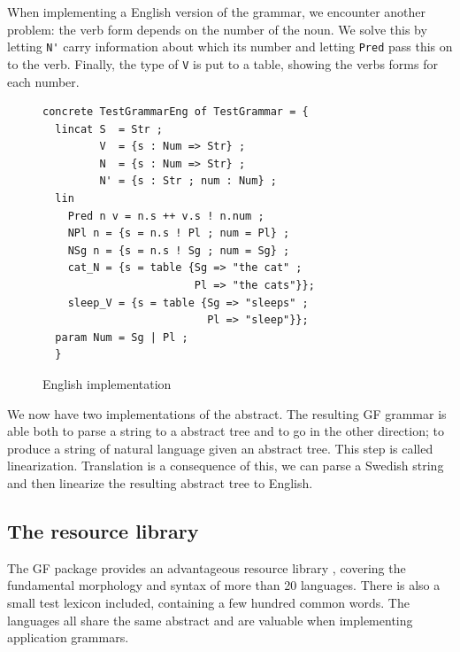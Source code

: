\documentclass{report}
\begin{document}
When implementing a English version of the grammar, we encounter another
problem: the verb form depends on the number of the noun. We solve this by letting
\verb|N'| carry
information about which its number and letting \verb|Pred| pass this on to the
verb. Finally, the type of \verb|V| is put to a table, showing the verbs forms for each
number.
\begin{figure}[h!]
\begin{verbatim}              
concrete TestGrammarEng of TestGrammar = {
  lincat S  = Str ;
         V  = {s : Num => Str} ;
         N  = {s : Num => Str} ;
         N' = {s : Str ; num : Num} ;
  lin   
    Pred n v = n.s ++ v.s ! n.num ;
    NPl n = {s = n.s ! Pl ; num = Pl} ;
    NSg n = {s = n.s ! Sg ; num = Sg} ;
    cat_N = {s = table {Sg => "the cat" ;
                        Pl => "the cats"}};
    sleep_V = {s = table {Sg => "sleeps" ; 
                          Pl => "sleep"}};
  param Num = Sg | Pl ;
  }
\end{verbatim}           
\caption{English implementation}
\label{fig:gfTestEng}
\end{figure}


We now have two implementations of the abstract. The resulting GF grammar is able both to
parse a string to a abstract tree and to go in the other direction; to produce
a string of natural language given an abstract tree. This step is called linearization.
Translation is a consequence of this, we can parse a Swedish string and then 
linearize the resulting abstract tree to English. 

\subsection{The resource library}
\label{sec:resources}
The GF package provides an advantageous resource library \cite{gf-resource}, covering the
fundamental morphology and syntax of more than 20 languages.
There is also a small test lexicon included, containing a few hundred common
words.
The languages all share the same abstract and are valuable
when implementing application grammars.
\end{document}
